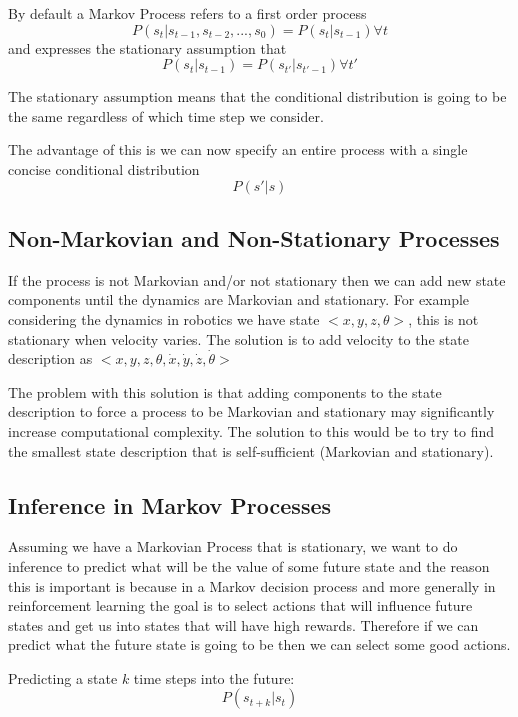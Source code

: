 \documentclass[12pt]{article}
\begin{document}
        By default a Markov Process refers to a first order process
        $$ P(s_t | s_{t-1}, s_{t-2}, ..., s_0) = P(s_t | s_{t-1}) \forall t $$
        and expresses the stationary assumption that
        $$ P(s_t | s_{t-1}) = P(s_{t'} | s_{t' - 1}) \forall t' $$

        The stationary assumption means that the conditional distribution is going to be the same regardless of which
        time step we consider. 

        The advantage of this is we can now specify an entire process with a single concise conditional distribution
        $$ P(s' | s) $$

    \subsection{Non-Markovian and Non-Stationary Processes}
        If the process is not Markovian and/or not stationary then we can add new state components until the dynamics
        are Markovian and stationary. For example considering the dynamics in robotics we have state $<x, y, z,
        \theta>$, this is not stationary when velocity varies. The solution is to add velocity to the state description
        as $<x, y, z, \theta, \dot{x}, \dot{y}, \dot{z}, \dot{\theta}>$

        The problem with this solution is that adding components to the state description to force a process to be
        Markovian and stationary may significantly increase computational complexity. The solution to this would be to
        try to find the smallest state description that is self-sufficient (Markovian and stationary).

    \subsection{Inference in Markov Processes}
        Assuming we have a Markovian Process that is stationary, we want to do inference to predict what will be the
        value of some future state and the reason this is important is because in a Markov decision process and more
        generally in reinforcement learning the goal is to select actions that will influence future states and get us
        into states that will have high rewards. Therefore if we can predict what the future state is going to be then
        we can select some good actions. 

        Predicting a state $k$ time steps into the future:
        $$ P(s_{t+k} | s_t) $$
\end{document}
